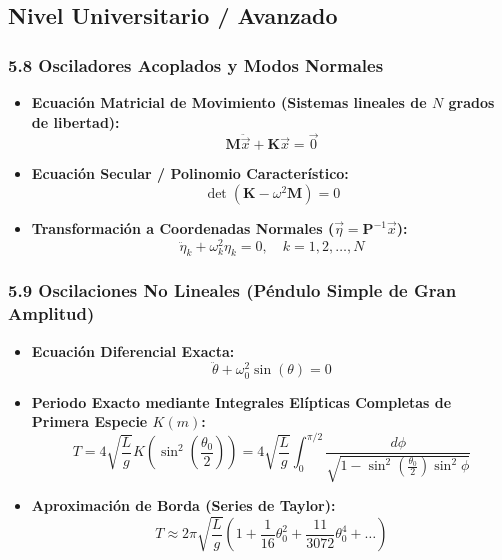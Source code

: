 \documentclass[11pt,a4paper]{article}
\begin{document}
\subsection*{Nivel Universitario / Avanzado}

\subsubsection*{5.8 Osciladores Acoplados y Modos Normales}

\begin{itemize}
  \item \textbf{Ecuación Matricial de Movimiento (Sistemas lineales de $N$ grados de libertad):}
  \[
    \mathbf{M} \ddot{\vec{x}} + \mathbf{K} \vec{x} = \vec{0}
  \]
  \item \textbf{Ecuación Secular / Polinomio Característico:}
  \[
    \det(\mathbf{K} - \omega^2 \mathbf{M}) = 0
  \]
  \item \textbf{Transformación a Coordenadas Normales ($\vec{\eta} = \mathbf{P}^{-1} \vec{x}$):}
  \[
    \ddot{\eta}_k + \omega_k^2 \eta_k = 0, \quad k = 1, 2, \dots, N
  \]
\end{itemize}

\subsubsection*{5.9 Oscilaciones No Lineales (Péndulo Simple de Gran Amplitud)}

\begin{itemize}
  \item \textbf{Ecuación Diferencial Exacta:}
  \[
    \ddot{\theta} + \omega_0^2 \sin(\theta) = 0
  \]
  \item \textbf{Periodo Exacto mediante Integrales Elípticas Completas de Primera Especie $K(m)$:}
  \[
    T = 4\sqrt{\frac{L}{g}} K\left(\sin^2\left(\frac{\theta_0}{2}\right)\right) = 4\sqrt{\frac{L}{g}} \int_0^{\pi/2} \frac{d\phi}{\sqrt{1 - \sin^2\left(\frac{\theta_0}{2}\right) \sin^2\phi}}
  \]
  \item \textbf{Aproximación de Borda (Series de Taylor):}
  \[
    T \approx 2\pi\sqrt{\frac{L}{g}} \left( 1 + \frac{1}{16}\theta_0^2 + \frac{11}{3072}\theta_0^4 + \dots \right)
  \]
\end{itemize}
\end{document}
